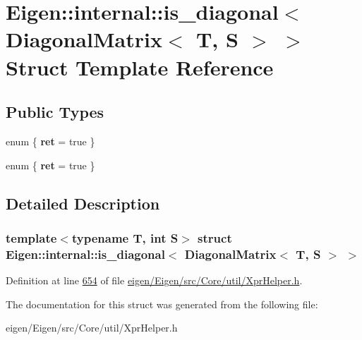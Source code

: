 \hypertarget{struct_eigen_1_1internal_1_1is__diagonal_3_01_diagonal_matrix_3_01_t_00_01_s_01_4_01_4}{}\section{Eigen\+:\+:internal\+:\+:is\+\_\+diagonal$<$ Diagonal\+Matrix$<$ T, S $>$ $>$ Struct Template Reference}
\label{struct_eigen_1_1internal_1_1is__diagonal_3_01_diagonal_matrix_3_01_t_00_01_s_01_4_01_4}
\subsection*{Public Types}
\begin{DoxyCompactItemize}
\item 
\mbox{\label{struct_eigen_1_1internal_1_1is__diagonal_3_01_diagonal_matrix_3_01_t_00_01_s_01_4_01_4_ada6b1a2bf56711e859181f0a2ca84c7f}} 
enum \{ {\bfseries ret} = true
 \}
\item 
\mbox{\label{struct_eigen_1_1internal_1_1is__diagonal_3_01_diagonal_matrix_3_01_t_00_01_s_01_4_01_4_a2c8ff16f25cd9332794d23e3ab225c86}} 
enum \{ {\bfseries ret} = true
 \}
\end{DoxyCompactItemize}


\subsection{Detailed Description}
\subsubsection*{template$<$typename T, int S$>$\newline
struct Eigen\+::internal\+::is\+\_\+diagonal$<$ Diagonal\+Matrix$<$ T, S $>$ $>$}



Definition at line \hyperlink{eigen_2_eigen_2src_2_core_2util_2_xpr_helper_8h_source_l00654}{654} of file \hyperlink{eigen_2_eigen_2src_2_core_2util_2_xpr_helper_8h_source}{eigen/\+Eigen/src/\+Core/util/\+Xpr\+Helper.\+h}.



The documentation for this struct was generated from the following file\+:\begin{DoxyCompactItemize}
\item 
eigen/\+Eigen/src/\+Core/util/\+Xpr\+Helper.\+h\end{DoxyCompactItemize}
